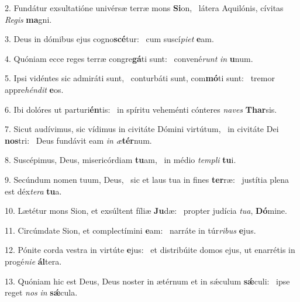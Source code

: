 2. Fundátur exsultatióne univérsæ terræ mons \textbf{Si}on, \ast\  látera Aquilónis, cívitas \textit{Re}\textit{gis} \textbf{ma}gni.\

3. Deus in dómibus ejus cogno\textbf{scé}tur: \ast\  cum suscí\textit{pi}\textit{et} \textbf{e}am.\

4. Quóniam ecce reges terræ congre\textbf{gá}ti sunt: \ast\  convené\textit{runt} \textit{in} \textbf{u}num.\

5. Ipsi vidéntes sic admiráti sunt, \dag\  conturbáti sunt, com\textbf{mó}ti sunt: \ast\  tremor appre\textit{hén}\textit{dit} \textbf{e}os.\

6. Ibi dolóres ut parturi\textbf{én}tis: \ast\  in spíritu veheménti cónteres \textit{na}\textit{ves} \textbf{Thar}sis.\

7. Sicut audívimus, sic vídimus in civitáte Dómini virtútum, \dag\  in civitáte Dei \textbf{nos}tri: \ast\  Deus fundávit eam \textit{in} \textit{æ}\textbf{tér}num.\

8. Suscépimus, Deus, misericórdiam \textbf{tu}am, \ast\  in médio \textit{tem}\textit{pli} \textbf{tu}i.\

9. Secúndum nomen tuum, Deus, \dag\  sic et laus tua in fines \textbf{ter}ræ: \ast\  justítia plena est déx\textit{te}\textit{ra} \textbf{tu}a.\

10. Lætétur mons Sion, et exsúltent fíliæ \textbf{Ju}dæ: \ast\  propter judícia \textit{tu}\textit{a}, \textbf{Dó}mine.\

11. Circúmdate Sion, et complectímini \textbf{e}am: \ast\  narráte in túr\textit{ri}\textit{bus} \textbf{e}jus.\

12. Pónite corda vestra in virtúte \textbf{e}jus: \ast\  et distribúite domos ejus, ut enarrétis in progé\textit{ni}\textit{e} \textbf{ál}tera.\

13. Quóniam hic est Deus, Deus noster in ætérnum et in sǽculum \textbf{sǽ}culi: \ast\  ipse reget \textit{nos} \textit{in} \textbf{sǽ}cula.\

